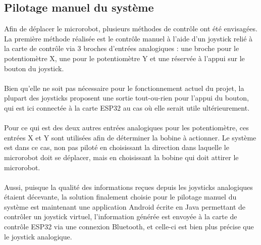 \documentclass{article}
\begin{document}
    \subsection{Pilotage manuel du système}
Afin de déplacer le microrobot, plusieurs méthodes de contrôle ont été envisagées. La première méthode réalisée est le contrôle manuel à l'aide d'un joystick relié à la carte de contrôle via 3 broches d'entrées analogiques : une broche pour le potentiomètre X, une pour le potentiomètre Y et une réservée à l'appui sur le bouton du joystick. 
\\\\
Bien qu'elle ne soit pas nécessaire pour le fonctionnement actuel du projet, la plupart des joysticks proposent une sortie tout-ou-rien pour l'appui du bouton, qui est ici connectée à la carte ESP32 au cas où elle serait utile ultérieurement.
        \\\\
        Pour ce qui est des deux autres entrées analogiques pour les potentiomètre, ces entrées X et Y sont utilisées afin de déterminer la bobine à actionner. Le système est dans ce cas, non pas piloté en choisissant la direction dans laquelle le microrobot doit se déplacer, mais en choisissant la bobine qui doit attirer le microrobot.
        \\\\
        Aussi, puisque la qualité des informations reçues depuis les joysticks analogiques étaient décevante, la solution finalement choisie pour le pilotage manuel du système est maintenant une application Android écrite en Java permettant de contrôler un joystick virtuel, l'information générée est envoyée à la carte de contrôle ESP32 via une connexion Bluetooth, et celle-ci est bien plus précise que le joystick analogique.
\end{document}
